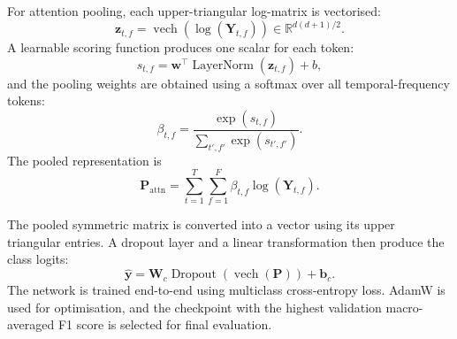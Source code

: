 For attention pooling, each upper-triangular log-matrix is vectorised:
\begin{equation}
    \bm{z}_{t,f}
    =
    \operatorname{vech}
    \left(\log(\bm{Y}_{t,f})\right)
    \in \mathbb{R}^{d(d+1)/2}.
\end{equation}
A learnable scoring function produces one scalar for each token:
\begin{equation}
    s_{t,f}
    =
    \bm{w}^{\top}
    \operatorname{LayerNorm}(\bm{z}_{t,f})+b,
\end{equation}
and the pooling weights are obtained using a softmax over all temporal-frequency
tokens:
\begin{equation}
    \beta_{t,f}
    =
    \frac{\exp(s_{t,f})}
         {\sum_{t',f'}\exp(s_{t',f'})}.
\end{equation}
The pooled representation is
\begin{equation}
    \bm{P}_{\mathrm{attn}}
    =
    \sum_{t=1}^{T}\sum_{f=1}^{F}
    \beta_{t,f}\log(\bm{Y}_{t,f}).
\end{equation}

The pooled symmetric matrix is converted into a vector using its upper
triangular entries. A dropout layer and a linear transformation then produce
the class logits:
\begin{equation}
    \widehat{\bm{y}}
    =
    \bm{W}_{c}\operatorname{Dropout}
    \left(\operatorname{vech}(\bm{P})\right)+\bm{b}_{c}.
\end{equation}
The network is trained end-to-end using multiclass cross-entropy loss. AdamW is
used for optimisation, and the checkpoint with the highest validation
macro-averaged F1 score is selected for final evaluation.
